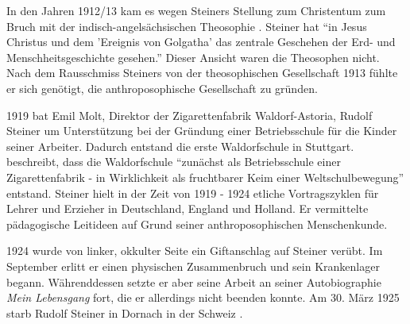 In den Jahren 1912/13 kam es wegen Steiners Stellung zum Christentum zum Bruch mit der indisch-angelsächsischen Theosophie \citep[vgl.][S. 80]{hemleben63}. Steiner hat \enquote{in Jesus Christus und dem 'Ereignis von Golgatha' das zentrale Geschehen der Erd- und Menschheitsgeschichte gesehen.}  Dieser Ansicht waren die Theosophen nicht. Nach dem Rausschmiss Steiners von der theosophischen Gesellschaft 1913 fühlte er sich genötigt, die anthroposophische Gesellschaft zu gründen.

1919 bat Emil Molt, Direktor der Zigarettenfabrik Waldorf-Astoria, Rudolf Steiner um Unterstützung bei der Gründung einer Betriebsschule für die Kinder seiner Arbeiter. Dadurch entstand die erste Waldorfschule in Stuttgart. \citet[S. 124]{hemleben63} beschreibt, dass die Waldorfschule \enquote{zunächst als Betriebsschule einer Zigarettenfabrik - in Wirklichkeit als fruchtbarer Keim einer Weltschulbewegung} entstand. Steiner hielt in der Zeit von 1919 - 1924 etliche Vortragszyklen für Lehrer und Erzieher in Deutschland, England und Holland. Er vermittelte pädagogische Leitideen auf Grund seiner anthroposophischen Menschenkunde. 

1924 wurde von linker, okkulter Seite ein Giftanschlag auf Steiner verübt. Im September erlitt er einen physischen Zusammenbruch und sein Krankenlager begann. Währenddessen setzte er aber seine Arbeit an seiner Autobiographie \emph{Mein Lebensgang} fort, die er allerdings nicht beenden konnte. Am 30. März 1925 starb Rudolf Steiner in Dornach in der Schweiz \citep[vgl.][]{karl12}.


















